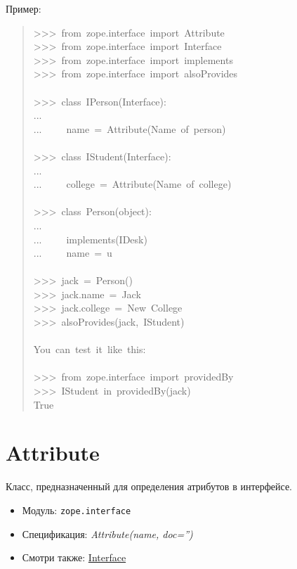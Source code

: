 \documentclass[a4paper,openany,twoside,final]{book}
\providecommand*{\DUroletitlereference}[1]{\textsl{#1}}
\begin{document}
Пример:

\begin{quote}{\ttfamily \raggedright \noindent
>{}>{}>~from~zope.interface~import~Attribute\\
>{}>{}>~from~zope.interface~import~Interface\\
>{}>{}>~from~zope.interface~import~implements\\
>{}>{}>~from~zope.interface~import~alsoProvides\\
~\\
>{}>{}>~class~IPerson(Interface):\\
...\\
...~~~~~name~=~Attribute(\textquotedbl{}Name~of~person\textquotedbl{})\\
~\\
>{}>{}>~class~IStudent(Interface):\\
...\\
...~~~~~college~=~Attribute(\textquotedbl{}Name~of~college\textquotedbl{})\\
~\\
>{}>{}>~class~Person(object):\\
...\\
...~~~~~implements(IDesk)\\
...~~~~~name~=~u\textquotedbl{}\textquotedbl{}\\
~\\
>{}>{}>~jack~=~Person()\\
>{}>{}>~jack.name~=~\textquotedbl{}Jack\textquotedbl{}\\
>{}>{}>~jack.college~=~\textquotedbl{}New~College\textquotedbl{}\\
>{}>{}>~alsoProvides(jack,~IStudent)\\
~\\
You~can~test~it~like~this:\\
~\\
>{}>{}>~from~zope.interface~import~providedBy\\
>{}>{}>~IStudent~in~providedBy(jack)\\
True
}
\end{quote}


\section*{Attribute%
  \label{attribute}%
}

Класс, предназначенный для определения атрибутов в интерфейсе.

\begin{itemize}

\item Модуль: \texttt{zope.interface}

\item Спецификация: \DUroletitlereference{Attribute(name, doc='')}

\item Смотри также: \hyperref[interface]{Interface}

\end{itemize}
\end{document}
